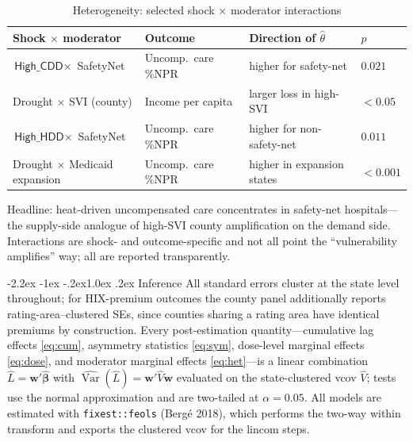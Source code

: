 \documentclass[11pt]{article}
\makeatletter
\renewcommand\section{\@startsection{section}{1}{\z@}%
  {-2.2ex \@plus -1ex \@minus -.2ex}{1.0ex \@plus .2ex}%
  {\normalfont\large\bfseries}}
\makeatother
\begin{document}
\begin{table}[h]
\centering
\caption{Heterogeneity: selected shock $\times$ moderator interactions}
\label{tab:het}
\small
\begin{tabular}{llll}
\toprule
Shock $\times$ moderator & Outcome & Direction of $\hat\theta$ & $p$ \\
\midrule
$\textsf{High\_CDD}\times$ SafetyNet & Uncomp.\ care \%NPR & higher for safety-net & $0.021$ \\
Drought $\times$ SVI (county) & Income per capita & larger loss in high-SVI & $<0.05$ \\
$\textsf{High\_HDD}\times$ SafetyNet & Uncomp.\ care \%NPR & higher for non-safety-net & $0.011$ \\
Drought $\times$ Medicaid expansion & Uncomp.\ care \%NPR & higher in expansion states & $<0.001$ \\
\bottomrule
\end{tabular}

\vspace{2pt}
\footnotesize\raggedright
Headline: heat-driven uncompensated care concentrates in safety-net hospitals---the
supply-side analogue of high-SVI county amplification on the demand side. Interactions
are shock- and outcome-specific and not all point the ``vulnerability amplifies'' way;
all are reported transparently.
\end{table}

\section{Inference}
All standard errors cluster at the state level throughout; for HIX-premium outcomes
the county panel additionally reports rating-area--clustered SEs, since counties
sharing a rating area have identical premiums by construction. Every post-estimation
quantity---cumulative lag effects \eqref{eq:cum}, asymmetry statistics \eqref{eq:sym},
dose-level marginal effects \eqref{eq:dose}, and moderator marginal effects
\eqref{eq:het}---is a linear combination $\hat L=\mathbf w'\hat{\boldsymbol\beta}$ with
$\widehat{\operatorname{Var}}(\hat L)=\mathbf w'\hat V\mathbf w$ evaluated on the
state-clustered vcov $\hat V$; tests use the normal approximation and are two-tailed at
$\alpha=0.05$. All models are estimated with \texttt{fixest::feols} (Bergé 2018), which
performs the two-way within transform and exports the clustered vcov for the
lincom steps.
\end{document}
